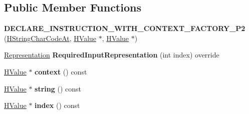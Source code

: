 \subsection*{Public Member Functions}
\begin{DoxyCompactItemize}
\item 
{\bfseries D\+E\+C\+L\+A\+R\+E\+\_\+\+I\+N\+S\+T\+R\+U\+C\+T\+I\+O\+N\+\_\+\+W\+I\+T\+H\+\_\+\+C\+O\+N\+T\+E\+X\+T\+\_\+\+F\+A\+C\+T\+O\+R\+Y\+\_\+\+P2} (\hyperlink{classv8_1_1internal_1_1_h_string_char_code_at}{H\+String\+Char\+Code\+At}, \hyperlink{classv8_1_1internal_1_1_h_value}{H\+Value} $\ast$, \hyperlink{classv8_1_1internal_1_1_h_value}{H\+Value} $\ast$)\hypertarget{classv8_1_1internal_1_1_h_string_char_code_at_a33d5b9af1dbc4d30668e7ee2ed1c38e1}{}\label{classv8_1_1internal_1_1_h_string_char_code_at_a33d5b9af1dbc4d30668e7ee2ed1c38e1}

\item 
\hyperlink{classv8_1_1internal_1_1_representation}{Representation} {\bfseries Required\+Input\+Representation} (int index) override\hypertarget{classv8_1_1internal_1_1_h_string_char_code_at_afc7e1fcf6b439e8300c7a685e210cd07}{}\label{classv8_1_1internal_1_1_h_string_char_code_at_afc7e1fcf6b439e8300c7a685e210cd07}

\item 
\hyperlink{classv8_1_1internal_1_1_h_value}{H\+Value} $\ast$ {\bfseries context} () const \hypertarget{classv8_1_1internal_1_1_h_string_char_code_at_a79fb9411934358ee89475d24bd653e27}{}\label{classv8_1_1internal_1_1_h_string_char_code_at_a79fb9411934358ee89475d24bd653e27}

\item 
\hyperlink{classv8_1_1internal_1_1_h_value}{H\+Value} $\ast$ {\bfseries string} () const \hypertarget{classv8_1_1internal_1_1_h_string_char_code_at_ad07a56b7dba2ef6b139bff97840d2a77}{}\label{classv8_1_1internal_1_1_h_string_char_code_at_ad07a56b7dba2ef6b139bff97840d2a77}

\item 
\hyperlink{classv8_1_1internal_1_1_h_value}{H\+Value} $\ast$ {\bfseries index} () const \hypertarget{classv8_1_1internal_1_1_h_string_char_code_at_a0730cdef2b39f16e060ebe49d0b2aa72}{}\label{classv8_1_1internal_1_1_h_string_char_code_at_a0730cdef2b39f16e060ebe49d0b2aa72}

\end{DoxyCompactItemize}
